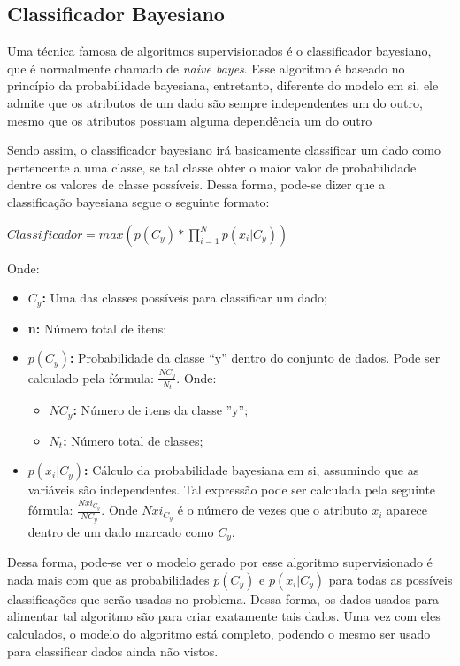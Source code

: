 \subsection{Classificador Bayesiano}

Uma técnica famosa de algoritmos supervisionados é o classificador bayesiano,
que é normalmente chamado de \textit{naive bayes}. Esse algoritmo é baseado no
princípio da probabilidade bayesiana, entretanto, diferente do modelo em si,
ele admite que os atributos de um dado são sempre independentes um do outro,
mesmo que os atributos possuam alguma dependência um do outro \cite{segaran2007programming}

Sendo assim, o classificador bayesiano irá basicamente classificar um dado
como pertencente a uma classe, se tal classe obter o maior valor de
probabilidade dentre os valores de classe possíveis. Dessa forma, pode-se
dizer que a classificação bayesiana segue o seguinte formato:

$Classificador = max(p(C_{y})*\prod_{i=1}^{N}p(x_{i}|C_{y}))$

Onde:

\begin{itemize}
    \item \textbf{$C_{y}$: } Uma das classes possíveis para classificar um
    dado;
    \item \textbf{n: } Número total de itens;
    \item \textbf{$p(C_{y})$: } Probabilidade da classe ``y'' dentro do
    conjunto de dados. Pode ser calculado pela
    fórmula: $\frac{NC_{y}}{N_{t}}$.
    Onde:
      \begin{itemize}
          \item \textbf{$NC_{y}$: } Número de itens da classe ''y'';
          \item \textbf{$N_{t}$: } Número total de classes;
      \end{itemize}
    \item \textbf{$p(x_{i}|C_{y})$: } Cálculo da probabilidade bayesiana
    em si, assumindo que as variáveis são independentes. Tal expressão
    pode ser calculada pela seguinte fórmula: $\frac{Nxi_{C_{y}}}{NC_{y}}$.
    Onde $Nxi_{C_{y}}$ é o número de vezes que o atributo $x_{i}$ aparece
    dentro de um dado marcado como $C_{y}$.
\end{itemize}

Dessa forma, pode-se ver o modelo gerado por esse algoritmo supervisionado
é nada mais com que as probabilidades $p(C_{y})$ e $p(x_{i}|C_{y})$ para
todas as possíveis classificações que serão usadas no problema. Dessa forma,
os dados usados para alimentar tal algoritmo são para criar exatamente tais
dados. Uma vez com eles calculados, o modelo do algoritmo está completo,
podendo o mesmo ser usado para classificar dados ainda não vistos.

